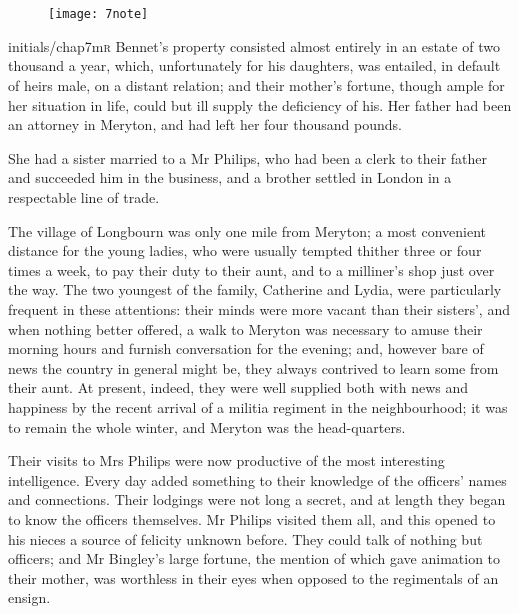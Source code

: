 
\chapter[Chapter \thechapter]{}

\begin{figure}[t!]
\centering
\texttt{[image: 7note]}
\end{figure}

\lettrine[lines=6,image=true]{initials/chap7m}{r}  Bennet's property consisted almost entirely in an estate of two thousand a year, which, unfortunately for his daughters, was entailed, in default of heirs male, on a distant relation; and their mother's fortune, though ample for her situation in life, could but ill supply the deficiency of his. Her father had been an attorney in Meryton, and had left her four thousand pounds.

She had a sister married to a Mr Philips, who had been a clerk to their father and succeeded him in the business, and a brother settled in London in a respectable line of trade.

The village of Longbourn was only one mile from Meryton; a most convenient distance for the young ladies, who were usually tempted thither three or four times a week, to pay their duty to their aunt, and to a milliner's shop just over the way. The two youngest of the family, Catherine and Lydia, were particularly frequent in these attentions: their minds were more vacant than their sisters', and when nothing better offered, a walk to Meryton was necessary to amuse their morning hours and furnish conversation for the evening; and, however bare of news the country in general might be, they always contrived to learn some from their aunt. At present, indeed, they were well supplied both with news and happiness by the recent arrival of a militia regiment in the neighbourhood; it was to remain the whole winter, and Meryton was the head-quarters.

Their visits to Mrs Philips were now productive of the most interesting intelligence. Every day added something to their knowledge of the officers' names and connections. Their lodgings were not long a secret, and at length they began to know the officers themselves. Mr Philips visited them all, and this opened to his nieces a source of felicity unknown before. They could talk of nothing but officers; and Mr Bingley's large fortune, the mention of which gave animation to their mother, was worthless in their eyes when opposed to the regimentals of an ensign.

